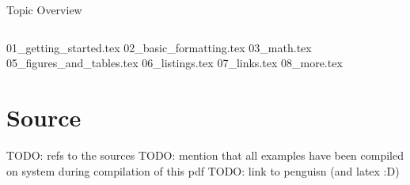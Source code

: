 



\begin{frame}{Topic Overview}
\begin{columns}[c,onlytextwidth]
\tableofcontents[sections={1-4}]
\tableofcontents[sections={5-8}]
\end{columns}
\end{frame}

{01_getting_started.tex}
{02_basic_formatting.tex}
{03_math.tex}
{05_figures_and_tables.tex}
{06_listings.tex}
{07_links.tex}
{08_more.tex}

\appendix
\beginbackup



\section{Source}
\begin{frame}
   TODO: refs to the sources
   TODO: mention that all examples have been compiled on system during compilation of this pdf
   TODO: link to penguisn (and latex :D)
\end{frame}
\backupend


